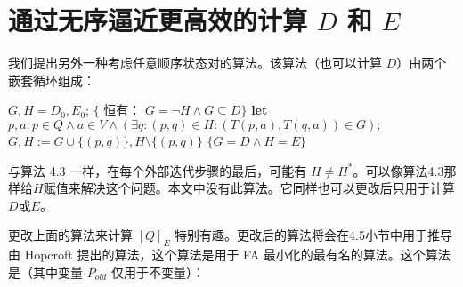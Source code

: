 \section{通过无序逼近更高效的计算 $D$ 和 $E$}

我们提出另外一种考虑任意顺序状态对的算法。该算法（也可以计算 $D$）由两个嵌套循环组成：

\begin{algorithm}
    \caption{}\label{al:4-5}
    \begin{algorithmic}[1]
        \State $G,H=D_0,E_0$; 
        \State $\{$ 恒有： $G= \neg H \land G \subseteq D \} $
            \State \textbf{let} $p,a:p\in Q \land a \in V \land ( \exists q : (p,q) \in H : (T(p,a),T(q,a)) \in G );$
                \State $ G,H := G \cup \{ (p,q) \},H \setminus \{ (p,q) \} $
            \EndFor
        \Until $\{  G=D \land H=E \}$
    \end{algorithmic}
\end{algorithm}

与算法 4.3 一样，在每个外部迭代步骤的最后，可能有 $H \not= H^*$。可以像算法4.3那样给$H$赋值来解决这个问题。本文中没有此算法。它同样也可以更改后只用于计算$D$或$E$。

更改上面的算法来计算 $[Q]_E$ 特别有趣。更改后的算法将会在4.5小节中用于推导由 Hopcroft 提出的算法，这个算法是用于 FA 最小化的最有名的算法。这个算法是（其中变量 $P_{old}$ 仅用于不变量）：


